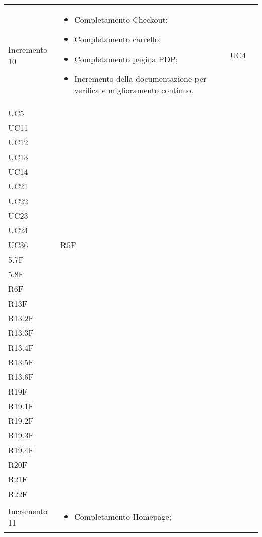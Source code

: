 \begin{longtable}{
    >{\centering}p{}
    >{\raggedright}p{}
    >{\centering}p{}
    >{\centering}p{}
    }
    Incremento 10                 & \vspace{-15px}
    \begin{itemize}
        \renewcommand\labelitemi{-}
        \item Completamento Checkout;
        \item Completamento carrello;
        \item Completamento pagina PDP;
        \item Incremento della documentazione per verifica e miglioramento continuo.
    \end{itemize}    & UC4                                                                                            \\ UC5 \\ UC11                                                                                                                                                                                     \\ UC12 \\UC13\\UC14\\ UC21 \\ UC22 \\ UC23 \\ UC24 \\ UC36 & R5F\\5.7F\\5.8F \\ R6F \\ R13F  \\ R13.2F \\R13.3F \\R13.4F \\ R13.5F \\ R13.6F \\ R19F \\ R19.1F \\ R19.2F \\ R19.3F \\ R19.4F \\ R20F \\ R21F \\ R22F
    \tabularnewline
    Incremento 11                 & \vspace{-15px}
    \begin{itemize}
        \renewcommand\labelitemi{-}
        \item Completamento Homepage;

\end{itemize}
\end{longtable}
